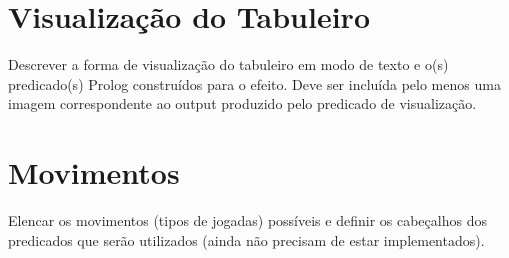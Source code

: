 \documentclass[a4paper]{article}
\begin{document}


\section{Visualização do Tabuleiro}

Descrever a forma de visualização do tabuleiro em modo de texto e o(s) predicado(s) Prolog construídos para o efeito.
Deve ser incluída pelo menos uma imagem correspondente ao output produzido pelo predicado de visualização.


\section{Movimentos}

Elencar os movimentos (tipos de jogadas) possíveis e definir os cabeçalhos dos predicados que serão utilizados (ainda não precisam de estar implementados).
\end{document}
